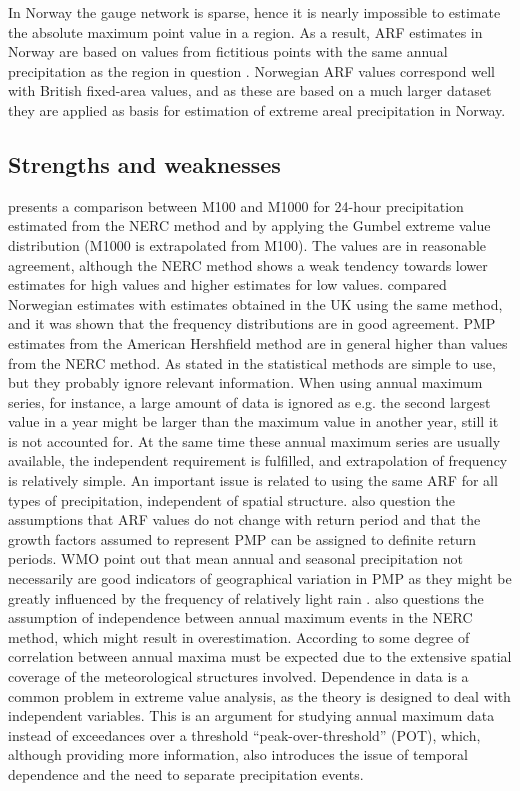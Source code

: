\documentclass[12pt,a4paper,english]{article}
\begin{document}
In Norway the gauge network is sparse, hence it is nearly impossible to estimate the absolute maximum point value in a region. As a result, ARF estimates in Norway are based on values from fictitious points with the same annual precipitation as the region in question \citep{Forland1987}. Norwegian ARF values correspond well with British fixed-area values, and as these are based on a much larger dataset they are applied as basis for estimation of extreme areal precipitation in Norway.

\subsection{Strengths and weaknesses}

\cite{Forland1983} presents a comparison between M100 and M1000 for 24-hour precipitation estimated from the NERC method and by applying the Gumbel extreme value distribution (M1000 is extrapolated from M100). The values are in reasonable agreement, although the NERC method shows a weak tendency towards lower estimates for high values and higher estimates for low values. \cite{Forland1987} compared Norwegian estimates with estimates obtained in the UK using the same method, and it was shown that the frequency distributions are in good agreement. PMP estimates from the American Hershfield method \citep{Hershfield1961a,Hershfield1961b,Hershfield1965} are in general higher than values from the NERC method. 
As stated in \cite{ForlandandKristoffersen1989} the statistical methods are simple to use, but they probably ignore relevant information. When using annual maximum series, for instance, a large amount of data is ignored as e.g. the second largest value in a year might be larger than the maximum value in another year, still it is not accounted for. At the same time these annual maximum series are usually available, the independent requirement is fulfilled, and extrapolation of frequency is relatively simple. An important issue is related to using the same ARF for all types of precipitation, independent of spatial structure. \cite{ForlandandKristoffersen1989} also question the assumptions that ARF values do not change with return period and that the growth factors assumed to represent PMP can be assigned to definite return periods.
WMO point out that mean annual and seasonal precipitation not necessarily are good indicators of geographical variation in PMP as they might be greatly influenced by the frequency of relatively light rain \citep{WMO2009a}. \cite{ICE1981} also questions the assumption of independence between annual maximum events in the NERC method, which might result in overestimation. According to \cite{ICE1981} some degree of correlation between annual maxima must be expected due to the extensive spatial coverage of the meteorological structures involved. Dependence in data is a common problem in extreme value analysis, as the theory is designed to deal with independent variables. This is an argument for studying annual maximum data instead of exceedances over a threshold ``peak-over-threshold'' (POT), which, although providing more information, also introduces the issue of temporal dependence and the need to separate precipitation events. 
\end{document}
